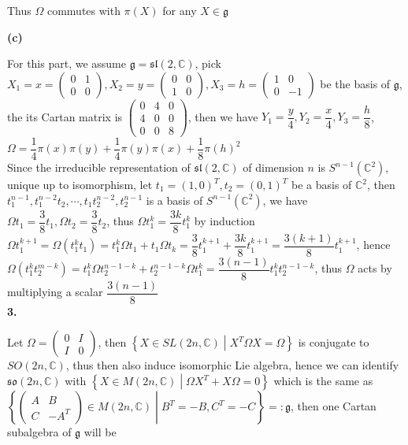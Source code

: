 \documentclass[10pt]{article}
\newcommand{\<}[1]{\langle #1 \rangle}
\begin{document}
Thus $\Omega$ commutes with $\pi(X)$ for any $X\in\mathfrak{g}$ \par
\textbf{(c)} \par
For this part, we assume $\mathfrak{g}=\mathfrak{sl}(2,\mathbb C)$, pick $X_1=x=\begin{pmatrix}
0&1 \\
0&0
\end{pmatrix}, X_2=y=\begin{pmatrix}
0&0 \\
1&0
\end{pmatrix}, X_3=h=\begin{pmatrix}
1&0 \\
0&-1
\end{pmatrix}$ be the basis of $\mathfrak{g}$, the its Cartan matrix is $\begin{pmatrix}
0&4&0 \\
4&0&0 \\
0&0&8
\end{pmatrix}$, then we have $Y_1=\dfrac{y}{4},Y_2=\dfrac{x}{4},Y_3=\dfrac{h}{8}$, $\Omega=\dfrac{1}{4}\pi(x)\pi(y)+\dfrac{1}{4}\pi(y)\pi(x)+\dfrac{1}{8}\pi(h)^2$ \\
Since the irreducible representation of $\mathfrak{sl}(2,\mathbb C)$ of dimension $n$ is $S^{n-1}(\mathbb C^2)$, unique up to isomorphism, let $t_1=(1,0)^T,t_2=(0,1)^T$ be a basis of $\mathbb C^2$, then $t_1^{n-1},t_1^{n-2}t_2,\cdots,t_1t_2^{n-2},t_2^{n-1}$ is a basis of $S^{n-1}(\mathbb C^2)$, we have $\Omega t_1=\dfrac{3}{8}t_1,\Omega t_2=\dfrac{3}{8}t_2$, thus $\Omega t_1^k=\dfrac{3k}{8}t_1^{k}$ by induction $\Omega t_1^{k+1}=\Omega\left(t_1^kt_1\right)=t_1^k\Omega t_1+t_1\Omega t_k=\dfrac{3}{8}t_1^{k+1}+\dfrac{3k}{8}t_1^{k+1}=\dfrac{3(k+1)}{8}t_1^{k+1}$, hence $\Omega(t_1^kt_2^{m-k})=t_1^k\Omega t_2^{n-1-k}+t_2^{n-1-k}\Omega t_1^k=\dfrac{3(n-1)}{8}t_1^kt_2^{n-1-k}$, thus $\Omega$ acts by multiplying a scalar $\dfrac{3(n-1)}{8}$ \\
\textbf{3.} \par
Let $\Omega=\begin{pmatrix}
0&I \\
I&0
\end{pmatrix}$, then $\left\{X\in SL(2n,\mathbb C)\middle|X^T\Omega X=\Omega\right\}$ is conjugate to $SO(2n,\mathbb C)$, thus then also induce isomorphic Lie algebra, hence we can identify $\mathfrak{so}(2n,\mathbb C)$ with $\left\{X\in M(2n,\mathbb C)\middle|\Omega X^T+X\Omega=0\right\}$ which is the same as $\left\{\begin{pmatrix}
A&B \\
C&-A^T
\end{pmatrix}\in M(2n,\mathbb C)\middle| B^T=-B,C^T=-C\right\}=:\mathfrak{g}$, then one Cartan subalgebra of $\mathfrak{g}$ will be \\
\end{document}
